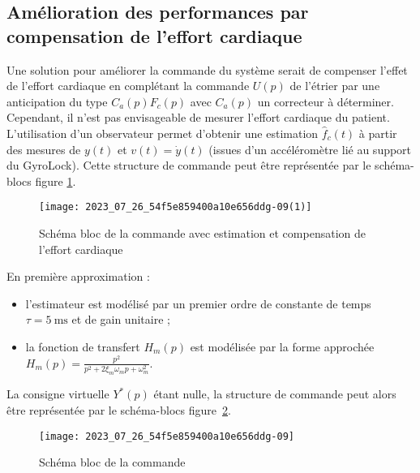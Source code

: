 
\subsection{\label{sec:III.C} Amélioration des performances par compensation de l'effort cardiaque}
Une solution pour améliorer la commande du système serait de compenser l'effet de l'effort cardiaque en complétant la commande $U(p)$ de l'étrier par une anticipation du type $C_{a}(p) F_{c}(p)$ avec $C_{a}(p)$ un correcteur à déterminer. Cependant, il n'est pas envisageable de mesurer l'effort cardiaque du patient. L'utilisation d'un observateur permet d'obtenir une estimation $\hat{f}_{c}(t)$ à partir des mesures de $y(t)$ et $v(t)=\dot{y}(t)$ (issues d'un accéléromètre lié au support du GyroLock). Cette structure de commande peut être représentée par le schéma-blocs figure \ref{fig_ccspsi2022:14}.

\begin{figure}[!h]
\centering
\texttt{[image: 2023\_07\_26\_54f5e859400a10e656ddg-09(1)]}
\caption{\label{fig_ccspsi2022:14}Schéma bloc de la commande avec estimation et compensation de l'effort cardiaque}
\end{figure}

En première approximation :
\begin{itemize}
\item l'estimateur est modélisé par un premier ordre de constante de temps $\tau=5 \mathrm{~ms}$ et de gain unitaire ;
  \item la fonction de transfert $H_{m}(p)$ est modélisée par la forme approchée $H_{m}(p)=\frac{p^{2}}{p^{2}+2 \xi_{m} \omega_{m} p+\omega_{m}^{2}}$.
\end{itemize}

La consigne virtuelle $Y^{*}(p)$ étant nulle, la structure de commande peut alors être représentée par le schéma-blocs figure~\ref{fig_ccspsi2022:15}.

\begin{figure}[!h]
\centering
\texttt{[image: 2023\_07\_26\_54f5e859400a10e656ddg-09]}
\caption{\label{fig_ccspsi2022:15}Schéma bloc de la commande}
\end{figure}


